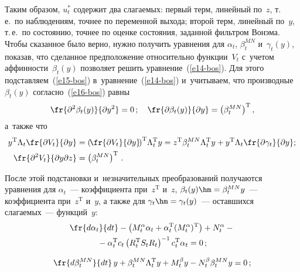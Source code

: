 \begin{multicols}{2}
     Таким образом, $u_t^*$ содержит два слагаемых: первый терм, 
линейный по~$z$, т.\,е.\ по наблюдениям, точнее по переменной выхода; 
второй терм, линейный по~$y$, т.\,е.\ по состоянию, точнее по оценке 
состояния, заданной фильтром Вонэма. Чтобы сказанное было верно, нужно 
получить уравнения для $\alpha_t$, $\beta_t^{MN}$ и~$\gamma_t(y)$, 
показав, что сделанное предположение относительно функции~$V_t$ 
с~учетом аффинности~$\beta_t(y)$ позволяет решить  
уравнение~(\ref{e14-bos}). Для этого подставляем~(\ref{e15-bos}) 
в~уравнение~(\ref{e14-bos}) и~учитываем, что производные~$\beta_t(y)$ 
согласно~(\ref{e16-bos}) равны 
$$
\fr{\partial^2 \beta_t(y)}{\partial y^2}=0\,;\quad 
\fr{\partial \beta_t(y)}{\partial y}= \left(\beta_t^{MN}\right)^{\mathrm{T}},
$$
 а~также что
     \begin{align*}
     y^{\mathrm{T}} \Lambda_t \fr{\partial V_t}{\partial y}&=\left(\! \fr{\partial V_t}{\partial 
y}\!\right)^{\mathrm{T}}\! \Lambda_t^{\mathrm{T}} y= z^{\mathrm{T}} \beta_t^{MN} \Lambda_t^{\mathrm{T}} y+ y^{\mathrm{T}} \Lambda_t 
\fr{\partial \gamma_t}{\partial y};
   \\
     \fr{\partial^2 V_t}{\partial y\partial z} &=\left( \beta_t^{MN}\right)^{\mathrm{T}}\,.
    \end{align*}
     
     После этой подстановки и~незначительных преобразований получаются 
уравнения для $\alpha_t$~--- коэффициента при~$z^{\mathrm{T}}$ и~$z$, $\beta_t(y)\hm= 
\beta_t^{MN} y$~--- коэффициента при~$z^{\mathrm{T}}$ и~$y$, а также для 
$\gamma_t\hm= \gamma_t(y)$~--- оставшихся слагаемых~--- функций~$y$:
     \begin{multline}
     \fr{d\alpha_t}{dt}-\left( M_t^\alpha \alpha_t +\alpha_t^{\mathrm{T}} 
(M_t^\alpha)^{\mathrm{T}}\right) +N_t^\alpha -{}\\
{}-\alpha_t^{\mathrm{T}} c_t \left(R_t^{\mathrm{T}} S_t R_t\right)^{-1} 
c_t^{\mathrm{T}} \alpha_t =0\,;\label{e19-bos}
\end{multline}

\noindent
\begin{equation}
     \fr{d\beta_t^{MN}}{dt}\,y +\beta_t^{MN}\Lambda_t^{\mathrm{T}} y+M_t^\beta y- 
N_t^\beta \beta_t^{MN} y=0\,;\label{e20-bos}
\end{equation}

\vspace*{-12pt}


\end{multicols}
